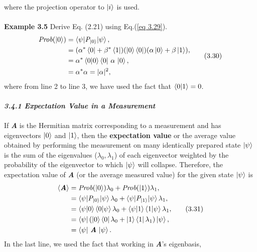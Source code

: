 \documentclass{article}
\begin{document}
where the projection operator to $\ket{i}$ is used.
\\\\
\textbf{Example 3.5} Derive Eq. (2.21) using Eq.(\ref{eq 3.29}).
\begin{align} \label{eq 3.30}
    \begin{split}
        \textit{Prob}(\ket{0}) &= \braket{\psi|\textit{{P}}_{\ket{0}}|\psi},\\
        &= (\alpha^*\bra{0}+\beta^*\bra{1})(\ket{0}\bra{0})(\alpha\ket{0}+\beta\ket{1}),\\
        &= \alpha^* \braket{0|0}\braket{0|\ \alpha \ |0},\\
        &= \alpha^*\alpha=|\alpha|^2,
    \end{split} \tag{3.30}
\end{align} 
where from line 2 to line 3, we have used the fact that $\braket{0|1}=0$.
\\\\
\textit{\textbf{3.4.1 Expectation Value in a Measurement}}
\\\\
If \textit{\textbf{A}} is the Hermitian matrix corresponding to a measurement and has eigenvectors 
$\ket{0}$ and $\ket{1}$, then the \textbf{expectation value} or the average
value obtained by performing the measurement on many identically prepared state 
$\ket{\psi}$ is the sum of the eigenvalues ($\lambda_0,\lambda_1$) of each eigenvector
weighted by the probability of the eigenvector to which $\ket{\psi}$ will collapse.
Therefore, the expectation value of \textit{\textbf{A}} (or the average measured value) for the given state
$\ket{\psi}$ is
\begin{align} \label{eq 3.31}
    \begin{split}
        \braket{\textit{\textbf{A}}} &= \textit{Prob}(\ket{0})\lambda_0+\textit{Prob}(\ket{1})\lambda_1,\\
        &= \braket{\psi|\textit{{P}}_{\ket{0}}|\psi}\lambda_0+\braket{\psi|\textit{{P}}_{\ket{1}}|\psi}\lambda_1,\\
        &= \braket{\psi|0}\braket{0|\psi}\lambda_0+\braket{\psi|1}\braket{1|\psi}\lambda_1,\\
        &= \bra{\psi}(\ket{0}\bra{0}\lambda_0+\ket{1}\bra{1}\lambda_1)\ket{\psi},\\
        &= \braket{\psi| \ \textit{\textbf{A}} \ |\psi}.
    \end{split} \tag{3.31}
\end{align}
In the last line, we used the fact that working in \textit{\textbf{A}}'s eigenbasis,
\end{document}
